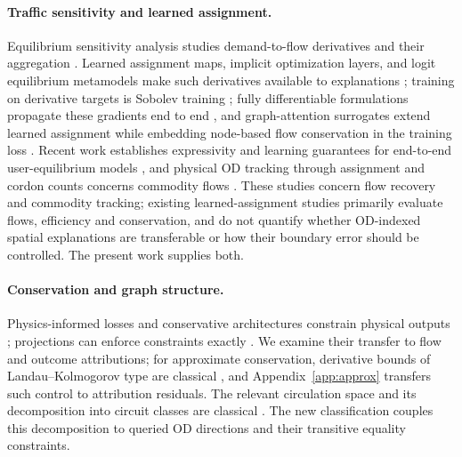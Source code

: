 \documentclass[a4paper,fleqn]{cas-sc}
\begin{document}
\paragraph{Traffic sensitivity and learned assignment.}
Equilibrium sensitivity analysis studies demand-to-flow derivatives and
their aggregation
\citep{tobin1988sensitivity,yang2005sensitivity,josefsson2007sensitivity,patriksson2003aggregated}.
Learned assignment maps, implicit optimization layers, and logit
equilibrium metamodels make such derivatives available to explanations
\citep{liu2023endtoend,amos2017optnet,lassen2025learning}; training on
derivative targets is Sobolev training
\citep{czarnecki2017sobolev,yuan2022sobolev}; fully differentiable
formulations propagate these gradients end to end
\citep{li2026differentiable,seo2026differentiable}, and graph-attention
surrogates extend learned assignment while embedding node-based flow
conservation in the training loss
\citep{liu2024heterogeneous,liu2025multiclass}. Recent work establishes
expressivity and learning guarantees for end-to-end user-equilibrium
models \citep{liu2025endtoend}, and physical OD tracking through
assignment and cordon counts concerns commodity flows
\citep{sheffi1985urban,vanzuylen1980most,bar2002origin}. These studies
concern flow recovery and commodity tracking; existing
learned-assignment studies primarily evaluate flows, efficiency and
conservation, and do not quantify whether OD-indexed spatial
explanations are transferable or how their boundary error should be
controlled. The present work supplies both.

\paragraph{Conservation and graph structure.}
Physics-informed losses and conservative architectures constrain physical
outputs \citep{raissi2019physics,shi2021physics,richterpowell2022neural};
projections can enforce constraints exactly \citep{valente2025physics,baez2024guaranteeing}.
We examine their transfer to flow and outcome attributions; for
approximate conservation, derivative bounds of Landau--Kolmogorov type
are classical \citep{shadrin2014landau}, and
Appendix~\ref{app:approx} transfers such control to attribution
residuals. The relevant
circulation space and its decomposition into circuit classes are classical
\citep{oxley2011matroid,hopcroft1973algorithm}. The new classification couples
this decomposition to queried OD directions and their transitive equality
constraints.
\end{document}
